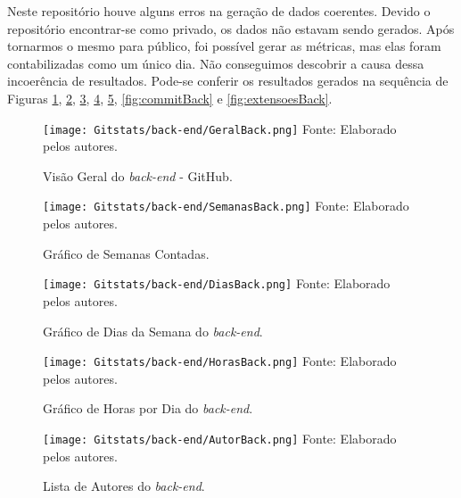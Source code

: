 \documentclass[
    12pt,               %
    openright,          %
    oneside,
    a4paper,            %
    BIBLATEX,           %
    TODO,               %
    english,            %
    brazil              %
    ]{ifsp-spo-inf-ctds}
\begin{document}
        Neste repositório houve alguns erros na geração de dados coerentes. Devido o repositório encontrar-se como privado, os dados não estavam sendo gerados. Após tornarmos o mesmo para público, foi possível gerar as métricas, mas elas foram contabilizadas como um único dia. Não conseguimos descobrir a causa dessa incoerência de resultados. 
        Pode-se conferir os resultados gerados na sequência de Figuras \ref{fig:geralBack}, \ref{fig:semanasBack}, \ref{fig:diasBack}, \ref{fig:HorasBack}, \ref{fig:AutorBack}, \ref{fig:commitBack} e \ref{fig:extensoesBack}.

            \begin{figure}[H]
                \centering
                \caption{Visão Geral do \emph{back-end} - GitHub.}
                \texttt{[image: Gitstats/back-end/GeralBack.png]}
                {\footnotesize Fonte: Elaborado pelos autores.}
                \label{fig:geralBack}
            \end{figure} 


            \begin{figure}[H]
                \centering
                \caption{Gráfico de Semanas Contadas.}
                \texttt{[image: Gitstats/back-end/SemanasBack.png]}
                {\footnotesize Fonte: Elaborado pelos autores.}
                \label{fig:semanasBack}
            \end{figure}   

            \begin{figure}[H]
                \centering
                \caption{Gráfico de Dias da Semana do \emph{back-end}.}
                \texttt{[image: Gitstats/back-end/DiasBack.png]}
                {\footnotesize Fonte: Elaborado pelos autores.}
                \label{fig:diasBack}
            \end{figure}

            \begin{figure}[H]
                \centering
                \caption{Gráfico de Horas por Dia do \emph{back-end}.}
                \texttt{[image: Gitstats/back-end/HorasBack.png]}
                {\footnotesize Fonte: Elaborado pelos autores.}
                \label{fig:HorasBack}
            \end{figure} 

            \begin{figure}[H]
                \centering
                \caption{Lista de Autores do \emph{back-end}.}
                \texttt{[image: Gitstats/back-end/AutorBack.png]}
                {\footnotesize Fonte: Elaborado pelos autores.}
                \label{fig:AutorBack}
            \end{figure}
            
\end{document}
